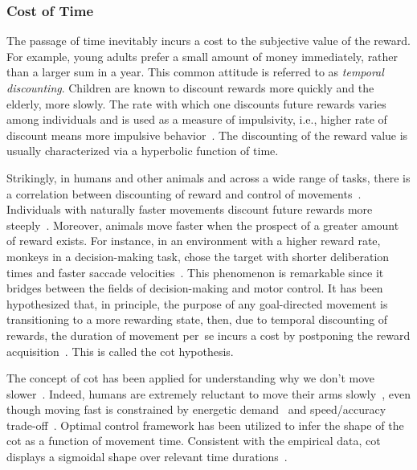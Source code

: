\subsubsection{Cost of Time}
The passage of time inevitably incurs a cost to the subjective value of the reward.
For example, young adults prefer a small amount of money immediately, rather than a larger sum in a year.
This common attitude is referred to as \emph{temporal discounting}\!{}.
Children are known to discount rewards more quickly and the elderly, more slowly.
The rate with which one discounts future rewards varies among individuals and is used as a measure of impulsivity, i.e., higher rate of discount means more impulsive behavior~\cite{Choi2014JNeurosci}.
The discounting of the reward value is usually characterized via a hyperbolic function of time.
\par
Strikingly, in humans and other animals and across a wide range of tasks, there is a correlation between discounting of reward and control of movements~\cite{Shadmehr2010Jneurosci, Choi2014JNeurosci, Berret2018SciReports, Shadmehr2016CurrBiol, Berret2016JNeurosci}.
Individuals with naturally faster movements discount future rewards more steeply~\cite{Choi2014JNeurosci}.
Moreover, animals move faster when the prospect of a greater amount of reward exists.
For instance, in an environment with a higher reward rate, monkeys in a decision-making task, chose the target with shorter deliberation times and faster saccade velocities~\cite{Thura2014JNeurosci}.
This phenomenon is remarkable since it bridges between the fields of decision-making and motor control.
It has been hypothesized that, in principle, the purpose of any goal-directed movement is transitioning to a more rewarding state, then, due to temporal discounting of rewards, the duration of movement per~se incurs a cost by postponing the reward acquisition~\cite{Shadmehr2010Jneurosci}.
This is called the \gls{cot} hypothesis.
\par
The concept of \gls{cot} has been applied for understanding why we don't move slower~\cite{Berret2016JNeurosci}.
Indeed, humans are extremely reluctant to move their arms slowly~\cite{Berret2018SciReports}, even though moving fast is constrained by energetic demand~\cite{Long2013RoSocInterface} and speed/accuracy trade-off~\cite{Harris2006BioCyber}.
Optimal control framework has been utilized to infer the shape of the \gls{cot} as a function of movement time.
Consistent with the empirical data, \gls{cot} displays a sigmoidal shape over relevant time durations~\cite{Berret2016JNeurosci}.
